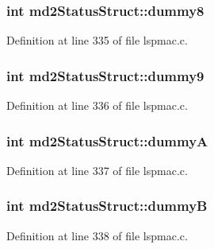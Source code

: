 \hypertarget{structmd2StatusStruct_a17f44367cfa4c66ec3ee481863ef4960}{
\subsubsection[{dummy8}]{\setlength{\rightskip}{0pt plus 5cm}int md2\-Status\-Struct\-::dummy8}}\label{structmd2StatusStruct_a17f44367cfa4c66ec3ee481863ef4960}


Definition at line 335 of file lspmac.\-c.

\hypertarget{structmd2StatusStruct_aa5aadda5a5cb98c6028f8b45e16cd084}{
\subsubsection[{dummy9}]{\setlength{\rightskip}{0pt plus 5cm}int md2\-Status\-Struct\-::dummy9}}\label{structmd2StatusStruct_aa5aadda5a5cb98c6028f8b45e16cd084}


Definition at line 336 of file lspmac.\-c.

\hypertarget{structmd2StatusStruct_a9fc7dc802d00c22463dd7ddd531e06d7}{
\subsubsection[{dummy\-A}]{\setlength{\rightskip}{0pt plus 5cm}int md2\-Status\-Struct\-::dummy\-A}}\label{structmd2StatusStruct_a9fc7dc802d00c22463dd7ddd531e06d7}


Definition at line 337 of file lspmac.\-c.

\hypertarget{structmd2StatusStruct_aab597be69a8dcc140778d9aeb8a50eee}{
\subsubsection[{dummy\-B}]{\setlength{\rightskip}{0pt plus 5cm}int md2\-Status\-Struct\-::dummy\-B}}\label{structmd2StatusStruct_aab597be69a8dcc140778d9aeb8a50eee}


Definition at line 338 of file lspmac.\-c.

